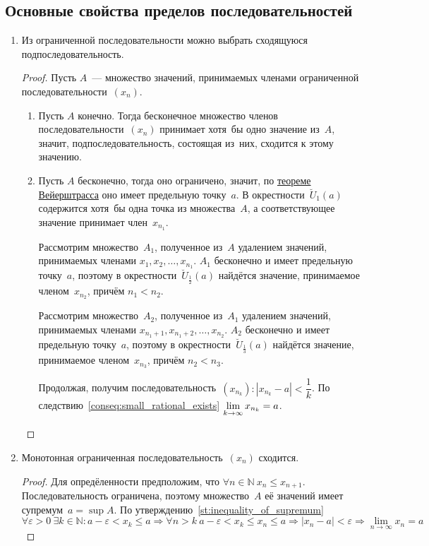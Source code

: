\subsection{Основные свойства пределов последовательностей}
\begin{enumerate}
	\item Из ограниченной последовательности можно выбрать сходящуюся подпоследовательность.
	\begin{proof}
	Пусть $A$~--- множество значений, принимаемых членами ограниченной последовательности~$(x_n)$.
	\begin{enumerate}
		\item Пусть $A$ конечно.
		Тогда бесконечное множество членов последовательности~$(x_n)$ принимает хотя~бы одно значение из~$A$, значит, подпоследовательность, состоящая из~них, сходится к этому значению.
		
		\item Пусть $A$ бесконечно, тогда оно ограничено, значит, по \hyperref[th:Weierstrass]{теореме Вейерштрасса} оно имеет предельную точку~$a$.
		В окрестности~$\breve U_1(a)$ содержится хотя~бы одна точка из множества~$A$, а соответствующее значение принимает член~$x_{n_1}$.
		
		Рассмотрим множество~$A_1$, полученное из~$A$ удалением значений, принимаемых членами $x_1, x_2, \ldots, x_{n_1}$.
		$A_1$ бесконечно и имеет предельную точку~$a$, поэтому в окрестности~$\breve U_\frac12(a)$ найдётся значение, принимаемое членом~$x_{n_2}$, причём $n_1 < n_2$.
		
		Рассмотрим множество~$A_2$, полученное из~$A_1$ удалением значений, принимаемых членами $x_{n_1 + 1}, x_{n_1 + 2}, \allowbreak \ldots, x_{n_2}$.
		$A_2$ бесконечно и имеет предельную точку~$a$, поэтому в окрестности~$\breve U_\frac13(a)$ найдётся значение, принимаемое членом~$x_{n_3}$, причём $n_2 < n_3$.
		
		Продолжая, получим последовательность~$(x_{n_k}) \colon |x_{n_k} - a| < \dfrac1k$. По следствию~\ref{conseq:small_rational_exists} $\displaystyle \lim_{k \to \infty} x_{n_k} \opbr= a$.
	\end{enumerate}
	\end{proof}
	
	\item Монотонная ограниченная последовательность~$(x_n)$ сходится.
	\begin{proof}
	Для опредёленности предположим, что $\forall n \in \mathbb N \ x_n \leqslant x_{n+1}$.
	Последовательность ограничена, поэтому множество~$A$ её значений имеет супремум~$a = \sup A$.
	По утверждению~\ref{st:inequality_of_supremum}
	\begin{equation*}
	\forall \varepsilon > 0 \ \exists k \in \mathbb N \colon a - \varepsilon < x_k \leqslant a \Rightarrow
	\forall n > k \ a - \varepsilon < x_k \leqslant x_n \leqslant a \Rightarrow
	|x_n - a| < \varepsilon \Rightarrow \lim_{n \to \infty} x_n = a
	\end{equation*}
	\end{proof}
	

\end{enumerate}
